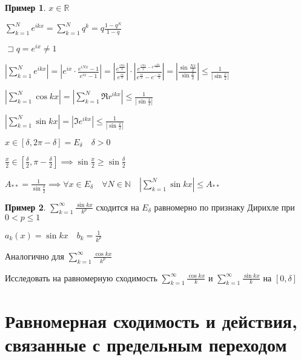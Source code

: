 \documentclass{book}
\newcommand\N{\ensuremath{\mathbb{N}}}
\newcommand\R{\ensuremath{\mathbb{R}}}
\theoremstyle{definition}
\newtheorem*{example}{Пример}
\begin{document}
    \begin{example}
        $x\in \R$

        $\sum_{k=1}^{N} e^{ikx} = \sum_{k=1}^{N} q^k = q \frac{1-q^N}{1-q}$ 

        $\sqsupset q = e^{ix}\neq 1$ 

        $\left| \sum_{k=1}^{N} e^{ikx} \right|  = \left| e^{ix} \cdot  \frac{e^{iNx} - 1}{e^{ix} - 1} \right| = \left| \frac{e^{\frac{iNx}{2}}}{e^{\frac{ix}{2}}} \right| \cdot \left| \frac{e^{\frac{iNx}{2} - e^{\frac{-iNx}{2}}}}{e^{\frac{ix}{2}} - e^{- \frac{ix}{2}}} \right| = \left| \frac{\sin \frac{Nx}{2}}{\sin \frac{x}{2}} \right| \leqslant  \frac{1}{\left| \sin \frac{x}{2} \right| }  $ 

            $\left| \sum_{k=1}^{N} \cos kx \right| = \left| \sum_{k=1}^{N} \Re r^{ikx} \right| \leqslant \frac{1}{\left| \sin \frac{x}{2} \right| }$

            $\left| \sum_{k=1}^{N} \sin kx \right| = \left| \Im e^{ikx} \right| \leqslant \frac{1}{\left| \sin \frac{x}{2} \right| }$

            $x \in [\delta, 2\pi -\delta] = E_{\delta}\quad \delta > 0$

            $\frac{x}{2}\in [\frac{\delta}{2}, \pi  - \frac{\delta}{2}]\implies  \sin \frac{x}{2} \geqslant  \sin  \frac{\delta}{2}$ 

            $A_{* *} = \frac{1}{\sin \frac{\delta}{2}} \implies \forall x\in E_{\delta}\quad \forall N\in \N \quad \left| \sum_{k=1}^{N} \sin kx \right| \leqslant A_{* *}$
    \end{example}
    \begin{example}
        $\sum_{k=1}^{\infty } \frac{\sin kx}{k^p}$ сходится на $E_{\delta}$ равномерно по признаку Дирихле при  $0<p\leqslant 1$

        $a_k(x) = \sin kx\quad b_k = \frac{1}{k^p}$ 

        Аналогично для $\sum_{k=1}^{\infty } \frac{\cos kx}{k^p}$
    \end{example}

    \begin{problem}
        Исследовать на равномерную сходимость $\sum_{k=1}^{\infty } \frac{\cos kx}{k}$ и $\sum_{k=1}^{\infty } \frac{\sin  kx}{k}$ на $[0, \delta]$
    \end{problem}

    \section{Равномерная сходимость и действия, связанные с предельным переходом}
\end{document}
